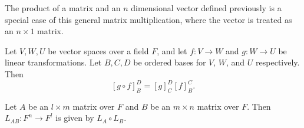\documentclass[12pt]{article}
\begin{document}
\begin{rmk}
    The product of a matrix and an $n$ dimensional vector defined previously is a special case of this general matrix multiplication, where the vector is treated as an $n \times 1$ matrix.
\end{rmk}

\begin{thm}
    Let $V, W, U$ be vector spaces over a field $F$, and let $f: V \to W$ and $g: W \to U$ be linear transformations. Let $B, C, D$ be ordered bases for $V$, $W$, and $U$ respectively. Then
    \[[g \circ f]_B^D = [g]_C^D[f]_B^C.\]
\end{thm}

\begin{cor}
    Let $A$ be an $l \times m$ matrix over $F$ and $B$ be an $m \times n$ matrix over $F$. Then $L_{AB}: F^n \to F^l$ is given by $L_A \circ L_B$.
\end{cor}
\end{document}
